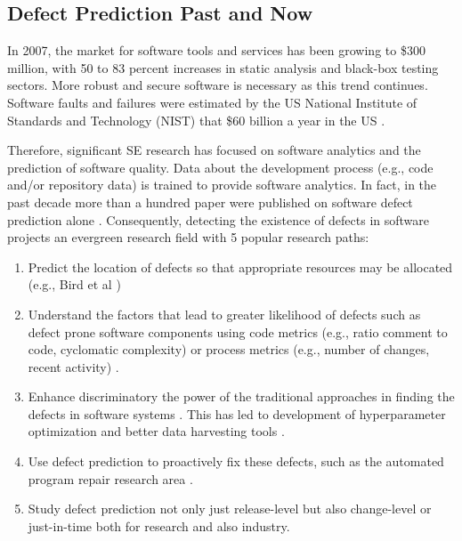\documentclass[sigconf,review, anonymous]{acmart}
\begin{document}
\begin{table}[!t]
{\begin{tabular}{l|l|l|p{12cm}|}
\end{tabular}}
\vspace{-7pt}
\end{table}

\subsection{Defect Prediction Past and Now}

In 2007, the market for software tools and services has been growing to \$300 million, with 50 to 83 percent increases in static analysis and black-box testing sectors. More robust and secure software is necessary as this trend continues. Software faults and
failures were estimated by the US National Institute of
Standards and Technology (NIST) that  \$60 billion a year in the US \cite{softwareecon}. 

Therefore, significant SE research has focused on software analytics and the prediction of software quality. Data about the development process (e.g., code and/or repository data) is trained to provide software analytics. In fact, in the past decade more than a hundred paper were published on software defect prediction alone \cite{sedp100}. Consequently, detecting the existence of defects in software projects an evergreen research field with 5 popular research paths:
\begin{enumerate}
    \item Predict the location of defects so that appropriate resources may be allocated (e.g., Bird et al \cite{bird09reliabity})
    \item Understand the factors that lead to greater likelihood of defects such as defect prone software components using code metrics (e.g., ratio comment to code, cyclomatic complexity) \cite{menzies10dp, menzies07dp, ambros10extensive} or process metrics (e.g., number of changes, recent activity) \cite{nagappan05codechurn,elbaum00codechurn, moser08changemetrics, hassan09codechanges}.
    \item Enhance discriminatory the power of the traditional approaches in finding the defects in software systems \cite{ghotra15}. This has led to development of hyperparameter optimization and better data harvesting tools \cite{agrawal2018wrong, agrawal2018better, Fu17easy, Fu16Grid, Fu2016TuningFS}. 
    \item Use defect prediction to proactively fix these defects, such as the automated program repair research area \cite{kamei16_lit, legoues12_aprlit, arcuri2011practical}. 
    \item Study defect prediction not only just release-level \cite{di18_fft, agrawal2018better} but also change-level or just-in-time \cite{yan18_tddetermination, kamei12_jit, nayrolles18_clever, commitguru} both for research and also industry.  
\end{enumerate}
\end{document}
